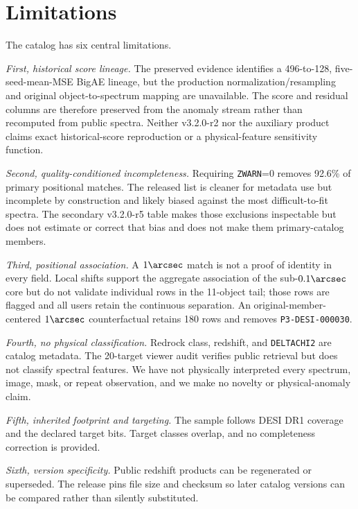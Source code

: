 \documentclass[twocolumn]{aastex701}
\newcommand{\releaseVersion}{v3.2.0-r2}
\newcommand{\warnedAuxVersion}{v3.2.0-r5}
\begin{document}
\section{Limitations}\label{sec:limitations}

The catalog has six central limitations.

\textit{First, historical score lineage.}  The preserved evidence identifies a 496-to-128,
five-seed-mean-MSE BigAE lineage, but the production normalization/resampling and original
object-to-spectrum mapping are unavailable.  The score and residual columns are therefore
preserved from the anomaly stream rather than recomputed from public spectra.  Neither
\releaseVersion{} nor the auxiliary product claims exact historical-score reproduction or a
physical-feature sensitivity function.

\textit{Second, quality-conditioned incompleteness.}  Requiring \texttt{ZWARN}=0 removes 92.6\%
of primary positional matches.  The released list is cleaner for metadata use but incomplete by
construction and likely biased against the most difficult-to-fit spectra.  The secondary
\warnedAuxVersion{} table makes those exclusions inspectable but does not estimate or correct that
bias and does not make them primary-catalog members.

\textit{Third, positional association.}  A $1\arcsec$ match is not a proof of identity in every
field.  Local shifts support the aggregate association of the sub-$0.1\arcsec$ core but do not
validate individual rows in the 11-object tail; those rows are flagged and all users retain the
continuous separation.  An original-member-centered $1\arcsec$ counterfactual retains 180 rows
and removes \texttt{P3-DESI-000030}.

\textit{Fourth, no physical classification.}  Redrock class, redshift, and \texttt{DELTACHI2} are
catalog metadata.  The 20-target viewer audit verifies public retrieval but does not classify
spectral features.  We have not physically interpreted every spectrum, image, mask, or repeat
observation, and we make no novelty or physical-anomaly claim.

\textit{Fifth, inherited footprint and targeting.}  The sample follows DESI DR1 coverage and the
declared target bits.  Target classes overlap, and no completeness correction is provided.

\textit{Sixth, version specificity.}  Public redshift products can be regenerated or superseded.
The release pins file size and checksum so later catalog versions can be compared rather than
silently substituted.
\end{document}
